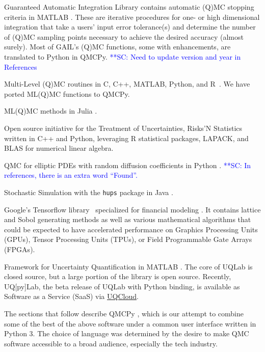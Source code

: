 \documentclass[graybox,footinfo]{svmult}
\newcommand{\scnote}[1]{ {\textcolor{blue}  {\mbox{**SC:} #1}}}
\begin{document}
\begin{description}[format=\textup,format=\textbf]
	\item[GAIL] Guaranteed Automatic Integration Library  contains automatic (Q)MC stopping criteria in MATLAB \cite{ChoEtal20a}. These are iterative procedures for one- or high dimensional integration that take a users' input error tolerance(s) and determine the number of (Q)MC sampling points necessary to achieve the desired accuracy (almost surely).  Most of GAIL's (Q)MC functions, some with enhancements, are translated to Python in QMCPy. \scnote{Need to update version and year in References}
	\item[ML(Q)MC] Multi-Level (Q)MC routines in C, C++, MATLAB, Python, and R~\cite{GilesSoft}. We have ported ML(Q)MC functions to QMCPy.
	\item[MultilevelEstimators.jl] ML(Q)MC methods in Julia \cite{Rob21}.
	\item[OpenTURNS] Open source initiative for the Treatment of Uncertainties, Risks'N Statistics \cite{OpenTURNS} written in C++ and Python, leveraging R statistical packages, LAPACK, and BLAS for numerical linear algebra.
	\item[QMC4PDE] QMC for elliptic PDEs with random diffusion coefficients in Python \cite{KuoNuy16a}. \scnote{In references, there is an extra word ``Found''.}
	\item[SSJ] Stochastic Simulation with the \texttt{hups} package in Java \cite{SSJ}.
	\item[TF Quant Finance] Google's Tensorflow library~\cite{tensorflow2015-whitepaper} specialized for financial modeling \cite{tfqf21} . It contains lattice and Sobol generating methods as well as various mathematical algorithms that could be expected to have accelerated performance on Graphics Processing Units (GPUs), Tensor Processing Units (TPUs), or Field Programmable Gate Arrays (FPGAs).	
	\item[UQLab] Framework for Uncertainty Quantification in MATLAB \cite{UQLab2014}.  The core of UQLab is closed source, but a large portion of the library is open source. Recently,  UQ[py]Lab, the beta release of UQLab with Python binding, is  available as Software as a Service (SaaS) via \href{https://uqpylab.uq-cloud.io}{UQCloud}.

\end{description}

The sections that follow describe QMCPy \cite{QMCPy2020a}, which is our attempt to combine some of the best of the above software under a common user interface written in Python 3.  The choice of language was determined by the desire to make QMC software accessible to a broad audience, especially the tech industry.
\end{document}
